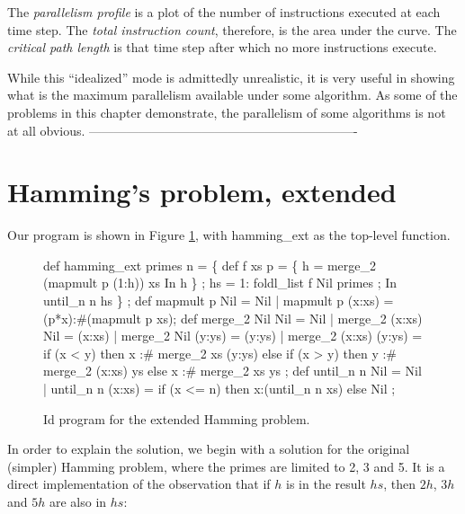 The {\em parallelism profile\/} is a plot of the number of instructions
executed at each time step.  The {\em total instruction count\/}, therefore,
is the area under the curve.  The {\em critical path length\/} is that time
step after which no more instructions execute.

While this ``idealized'' mode is admittedly unrealistic, it is very
useful in showing what is the maximum parallelism available under some
algorithm.  As some of the problems in this chapter demonstrate, the
parallelism of some algorithms is not at all obvious.
----------------------------------------------------------------


\section{Hamming's problem, extended}

Our program is shown in Figure \ref{hamming-program}, with {\cf
hamming\_ext} as the top-level function.

\begin{figure}[htbp]
 \hdivider
\begin{idenv}
def hamming\_ext primes n =
    \{ def f xs p = \{  h = merge\_2 (mapmult p (1:h)) xs
                   In
                      h \} ;
      hs = 1: foldl\_list f Nil primes ;
    In
      until\_n n hs \} ;
\null
def mapmult p Nil    = Nil
 |  mapmult p (x:xs) = (p*x):#(mapmult p xs);
\null
def merge\_2 Nil    Nil    = Nil
 |  merge\_2 (x:xs) Nil    = (x:xs)
 |  merge\_2 Nil    (y:ys) = (y:ys)
 |  merge\_2 (x:xs) (y:ys) = if (x < y) then
                              x :# merge\_2 xs (y:ys)
                            else if (x > y) then
                              y :# merge\_2 (x:xs) ys
                            else
                              x :# merge\_2 xs ys ;
\null
def until\_n n Nil    = Nil
 |  until\_n n (x:xs) = if (x <= n) then
                         x:(until\_n n xs)
                       else
                         Nil ;
\end{idenv}
 \caption{%
    \label{hamming-program}
    Id program for the extended Hamming problem.
         }
 \hdivider
\end{figure}

In order to explain the solution, we begin with a solution for the
original (simpler) Hamming problem, where the primes are limited to 2,
3 and 5.  It is a direct implementation of the observation that if $h$
is in the result $hs$, then $2h$, $3h$ and $5h$ are also in $hs$:

